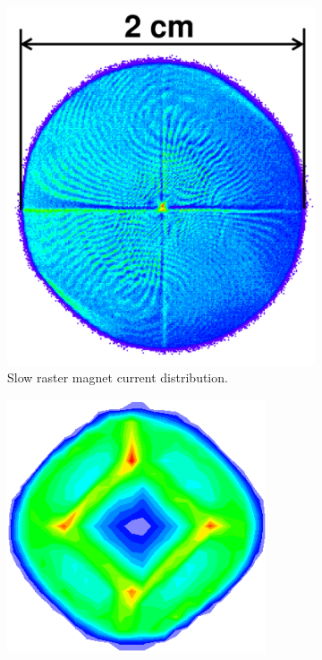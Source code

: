 \begin{figure}[tb!]
  \centering
  \begin{subfigure}[t]{0.2\textwidth}
    \includegraphics[width=\textwidth]{figs/slow-raster-pattern.png}
    \caption{Slow raster magnet current distribution. \label{C5S2SS5F2a}}
  \end{subfigure}
  \qquad
  \begin{subfigure}[t]{0.2\textwidth}
    \includegraphics[width=\textwidth]{figs/slow-raster-pattern-data-bad.png}

\end{subfigure}
\end{figure}
